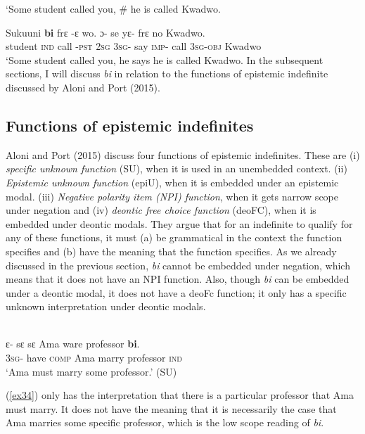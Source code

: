 \documentclass[output=paper,modfonts]{langsci/langscibook}
\begin{document}
\glt `Some student called you, \# he is called Kwadwo.

\ex \label{ex33}
\gll  Sukuuni \textbf{bi} frε -ε wo. ɔ- se yε- frε no Kwadwo.\\
 student \textsc{ind} call -\textsc{pst}  \textsc{2sg} \textsc{3sg}- say \textsc{imp}- call  \textsc{3sg}-\textsc{obj} Kwadwo\\
\glt `Some student called you, he says he is called Kwadwo.
\z\z In the subsequent sections, I will discuss \emph{bi} in relation to the functions of epistemic indefinite discussed by  Aloni and Port (2015).

\subsection{Functions of epistemic indefinites}

Aloni and Port (2015) discuss four functions of epistemic indefinites. These are (i) \emph{specific unknown function} (SU), when it is used in an unembedded context. (ii) \emph{Epistemic unknown function} (epiU), when it is embedded under an epistemic modal. (iii) \emph{Negative polarity item (NPI) function}, when it gets narrow scope under negation and (iv) \emph{deontic free choice function} (deoFC), when it is embedded under deontic modals. They argue that for an indefinite to qualify for any of these functions, it must (a) be grammatical in the context the function specifies and (b) have the meaning that the function specifies. As we already discussed in the previous section, \emph{bi} cannot be embedded under negation, which means that it does not have an NPI function. Also, though \emph{bi} can be embedded under a deontic modal, it does not have a deoFc function; it only has a specific unknown interpretation under deontic modals. 

\ea\label{ex34}\\
 \gll ε- sε  sε Ama ware professor \textbf{bi}.\\
\textsc{3sg}- have \textsc{comp} Ama marry professor \textsc{ind} \\
    
\glt `Ama must marry some professor.' (SU)

\z (\ref{ex34}) only has the interpretation that there is a particular professor that Ama must marry. It does not have the meaning that it is necessarily the case that Ama marries some specific professor, which is the low scope reading of \emph{bi}. 
\end{document}
